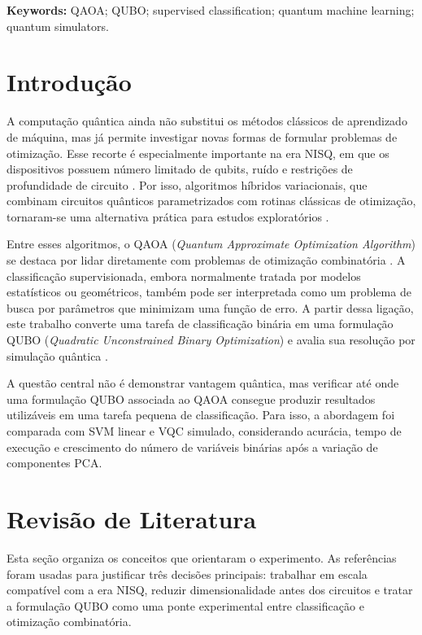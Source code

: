 \documentclass[12pt]{unisenaiclass}
\begin{document}
\begin{justify}
    \textbf{Keywords:} QAOA; QUBO; supervised classification; quantum machine learning; quantum simulators.
\end{justify}

\newpage

\section{Introdução}
A computação quântica ainda não substitui os métodos clássicos de aprendizado de máquina, mas já permite investigar novas formas de formular problemas de otimização. Esse recorte é especialmente importante na era NISQ, em que os dispositivos possuem número limitado de qubits, ruído e restrições de profundidade de circuito \cite{preskill2018nisq,bharti2022nisq}. Por isso, algoritmos híbridos variacionais, que combinam circuitos quânticos parametrizados com rotinas clássicas de otimização, tornaram-se uma alternativa prática para estudos exploratórios \cite{cerezo2021vqa,grange2024vqa}.

Entre esses algoritmos, o QAOA (\textit{Quantum Approximate Optimization Algorithm}) se destaca por lidar diretamente com problemas de otimização combinatória \cite{farhi2014qaoa}. A classificação supervisionada, embora normalmente tratada por modelos estatísticos ou geométricos, também pode ser interpretada como um problema de busca por parâmetros que minimizam uma função de erro. A partir dessa ligação, este trabalho converte uma tarefa de classificação binária em uma formulação QUBO (\textit{Quadratic Unconstrained Binary Optimization}) e avalia sua resolução por simulação quântica \cite{glover2019qubo,lucas2014ising}.

A questão central não é demonstrar vantagem quântica, mas verificar até onde uma formulação QUBO associada ao QAOA consegue produzir resultados utilizáveis em uma tarefa pequena de classificação. Para isso, a abordagem foi comparada com SVM linear e VQC simulado, considerando acurácia, tempo de execução e crescimento do número de variáveis binárias após a variação de componentes PCA.

\clearpage

\section{Revisão de Literatura}
Esta seção organiza os conceitos que orientaram o experimento. As referências foram usadas para justificar três decisões principais: trabalhar em escala compatível com a era NISQ, reduzir dimensionalidade antes dos circuitos e tratar a formulação QUBO como uma ponte experimental entre classificação e otimização combinatória.
\end{document}
